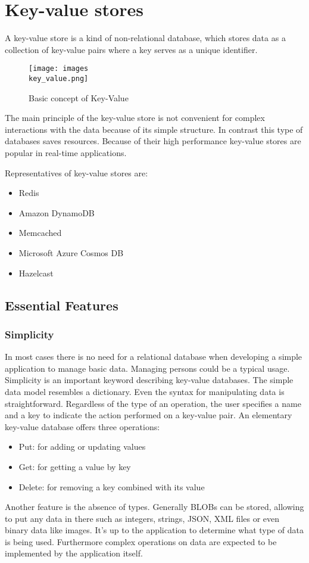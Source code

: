 \chapter{Key-value stores}
A key-value store is a kind of non-relational database, which stores data as a
collection of key-value pairs where a key serves as a unique identifier.
\begin{figure}[h]
    \texttt{[image: images\\key\_value.png]}
    \caption{Basic concept of Key-Value}
\end{figure}

The main principle of the key-value store is not convenient for complex
interactions with the data because of its simple structure. In contrast this
type of databases saves resources. Because of their high performance key-value
stores are popular in real-time applications.

Representatives of key-value stores are:
\begin{itemize}
    \item Redis
    \item Amazon DynamoDB
    \item Memcached
    \item Microsoft Azure Cosmos DB
    \item Hazelcast
\end{itemize}
\cite{dbkeyvalue}

\section{Essential Features}
\subsection{Simplicity}
In most cases there is no need for a relational database when developing a
simple application to manage basic data. Managing persons could be a typical
usage. Simplicity is an important keyword describing key-value databases. The
simple data model resembles a dictionary. Even the syntax for manipulating data
is straightforward. Regardless of the type of an operation, the user specifies a
name and a key to indicate the action performed on a key-value pair. An
elementary key-value database offers three operations:
\begin{itemize}
    \item Put: for adding or updating values
    \item Get: for getting a value by key
    \item Delete: for removing a key combined with its value
\end{itemize}
Another feature is the absence of types. Generally BLOBs can be stored, allowing
to put any data in there such as integers, strings, JSON, XML files or even
binary data like images. It’s up to the application to determine what type of
data is being used. Furthermore complex operations on data are expected to be
implemented by the application itself.


